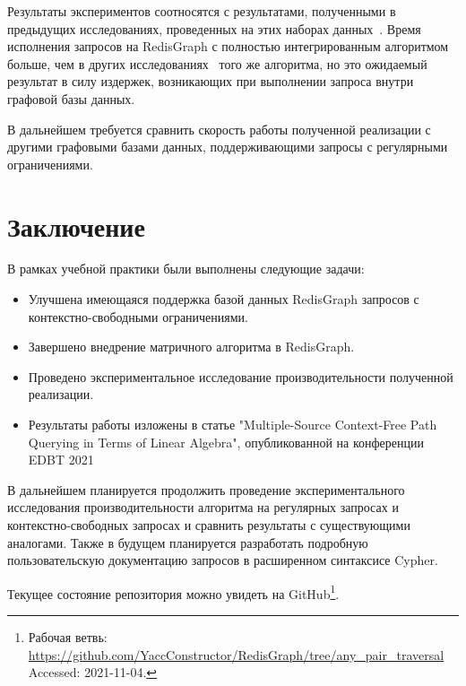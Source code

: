 \documentclass[14pt]{matmex-diploma-custom}
\begin{document}
Результаты экспериментов соотносятся с результатами, полученными в предыдущих исследованиях, проведенных на этих наборах данных~\cite{Arseniy-diploma}. Время исполнения запросов на RedisGraph с полностью интегрированным алгоритмом больше, чем в других исследованиях~\cite{azimov-algo} того же алгоритма, но это ожидаемый результат в силу издержек, возникающих при выполнении запроса внутри графовой базы данных.

В дальнейшем требуется сравнить скорость работы полученной реализации с другими графовыми базами данных, поддерживающими запросы с регулярными ограничениями.

\section*{Заключение}
В рамках учебной практики были выполнены следующие задачи:
\begin{itemize}
    \item Улучшена имеющаяся поддержка базой данных RedisGraph запросов с контекстно-свободными ограничениями.
    \item Завершено внедрение матричного алгоритма в RedisGraph.
    \item Проведено экспериментальное исследование производительности полученной реализации.
    \item Результаты работы изложены в статье "Multiple-Source Context-Free Path Querying in Terms of
Linear Algebra", опубликованной на конференции EDBT 2021
\end{itemize}

В дальнейшем планируется продолжить проведение экспериментального исследования производительности алгоритма на регулярных запросах и контекстно-свободных запросах и сравнить результаты с существующими аналогами. Также в будущем планируется разработать подробную пользовательскую документацию запросов в расширенном синтаксисе Cypher.

Текущее состояние репозитория можно увидеть на GitHub\footnote{Рабочая ветвь: \url{https://github.com/YaccConstructor/RedisGraph/tree/any_pair_traversal} Accessed: 2021-11-04.}.
\setmonofont[Mapping=tex-text]{CMU Typewriter Text}


\end{document}
